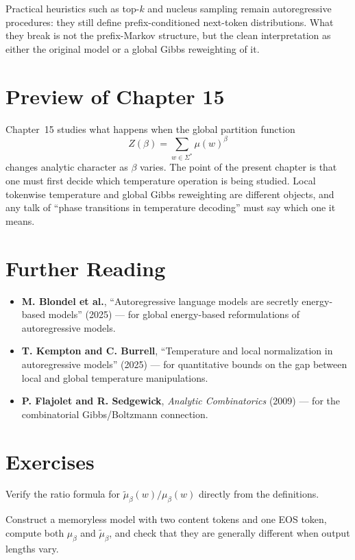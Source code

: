 Practical heuristics such as top-$k$ and nucleus sampling remain autoregressive procedures: they still define prefix-conditioned next-token distributions. What they break is not the prefix-Markov structure, but the clean interpretation as either the original model or a global Gibbs reweighting of it.

\section*{Preview of Chapter 15}

Chapter~15 studies what happens when the global partition function
\[
  Z(\beta)=\sum_{w \in \Sigma^*} \mu(w)^\beta
\]
changes analytic character as $\beta$ varies. The point of the present chapter is that one must first decide which temperature operation is being studied. Local tokenwise temperature and global Gibbs reweighting are different objects, and any talk of ``phase transitions in temperature decoding'' must say which one it means.

\section*{Further Reading}

\begin{itemize}
  \item \textbf{M. Blondel et al.}, ``Autoregressive language models are secretly energy-based models'' (2025) \cite{BlondelEtAl2025} --- for global energy-based reformulations of autoregressive models.
  \item \textbf{T. Kempton and C. Burrell}, ``Temperature and local normalization in autoregressive models'' (2025) \cite{KemptonBurrell2025} --- for quantitative bounds on the gap between local and global temperature manipulations.
  \item \textbf{P. Flajolet and R. Sedgewick}, \emph{Analytic Combinatorics} (2009) \cite{FlajoletSedgewick2009} --- for the combinatorial Gibbs/Boltzmann connection.
\end{itemize}

\section{Exercises}

\begin{exercise}
Verify the ratio formula for $\widetilde\mu_\beta(w)/\mu_\beta(w)$ directly from the definitions.
\end{exercise}

\begin{exercise}
Construct a memoryless model with two content tokens and one EOS token, compute both $\mu_\beta$ and $\widetilde\mu_\beta$, and check that they are generally different when output lengths vary.
\end{exercise}
